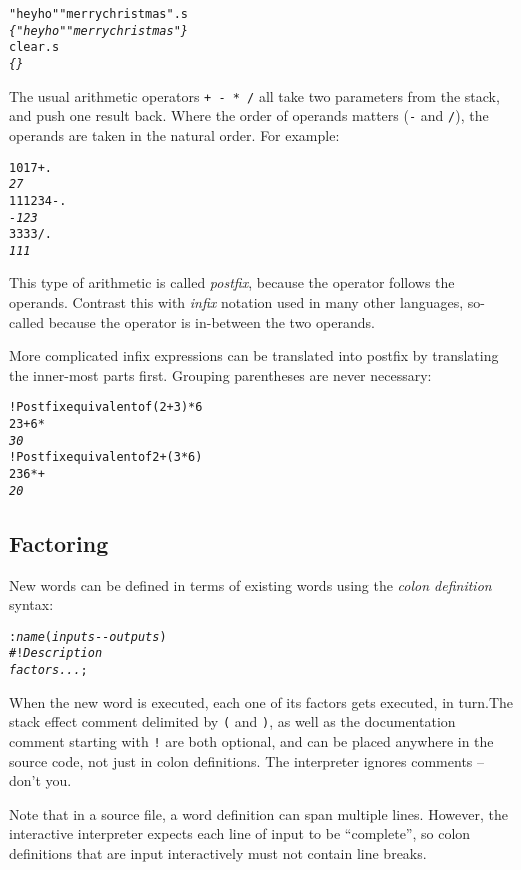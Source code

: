 \documentclass[english]{article}
\begin{document}
\begin{alltt}
"hey ho" "merry christmas" .s
\emph{\{ "hey ho" "merry christmas" \}}
clear .s
\emph{\{ \}}
\end{alltt}

The usual arithmetic operators \texttt{+ - {*} /} all take two parameters
from the stack, and push one result back. Where the order of operands
matters (\texttt{-} and \texttt{/}), the operands are taken in the natural order. For example:

\begin{alltt}
10 17 + .
\emph{27}
111 234 - .
\emph{-123}
333 3 / .
\emph{111}
\end{alltt}

This type of arithmetic is called \emph{postfix}, because the operator
follows the operands. Contrast this with \emph{infix} notation used
in many other languages, so-called because the operator is in-between
the two operands.

More complicated infix expressions can be translated into postfix
by translating the inner-most parts first. Grouping parentheses are
never necessary:

\begin{alltt}
! Postfix equivalent of (2 + 3) {*} 6
2 3 + 6 {*}
\emph{30}
! Postfix equivalent of 2 + (3 {*} 6)
2 3 6 {*} +
\emph{20}
\end{alltt}

\subsection{Factoring}

New words can be defined in terms of existing words using the \emph{colon
definition} syntax:

\begin{alltt}
: \emph{name} ( \emph{inputs} -{}- \emph{outputs} )
    \#! \emph{Description}
    \emph{factors ...} ;
\end{alltt}

When the new word is executed, each one of its factors gets executed,
in turn.The stack effect comment delimited by \texttt{(} and \texttt{)},
as well as the documentation comment starting with \texttt{!} are
both optional, and can be placed anywhere in the source code, not
just in colon definitions. The interpreter ignores comments -- don't you.

Note that in a source file, a word definition can span multiple lines.
However, the interactive interpreter expects each line of input to
be ``complete'', so colon definitions that are input interactively must not contain line breaks.
\end{document}
